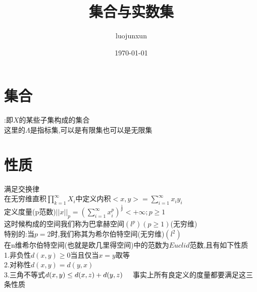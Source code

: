 \documentclass[12pt, a4paper, oneside]{ctexart}
\title{\huge\textbf{集合与实数集}}
\author{luojunxun}
\date{\today}
\begin{document}
\maketitle

\section*{集合}
:即$X$的某些子集构成的集合
\\
这里的$\Lambda$是指标集,可以是有限集也可以是无限集

\section*{性质}


 满足交换律
\\
在无穷维直积$\prod\limits_{k=1}^\infty X_i$中定义内积$<x,y>=\sum\limits_{i=1}^\infty x_iy_i$\\
定义度量(p范数)$||x||_p=(\sum\limits_{i=1}^\infty x_i^p)^{\frac{1}{p}}<+\infty;p\geq 1$\\
    这时候构成的空间我们称为巴拿赫空间$(l^p)(p\geq 1)$(无穷维)\\
    特别的:当$p=2$时,我们称其为希尔伯特空间(无穷维)$(l^2)$\\
    
    在n维希尔伯特空间(也就是欧几里得空间)中的范数为$Euclid$范数,且有如下性质\\
    1.非负性$d(x,y)\geq 0$当且仅当$x=y$取等\\
    2.对称性$d(x,y)=d(y,x)$\\
    3.三角不等式$d(x,y)\leq d(x,z)+d(y,z)\\\quad$
    事实上所有良定义的度量都要满足这三条性质
    
\end{document}
